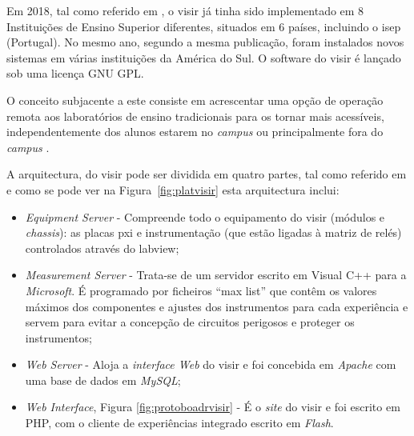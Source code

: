 Em 2018, tal como referido em \cite{PILARFederationVISIR}, o \acrshort{visir} já tinha sido implementado em 8 Instituições de Ensino Superior diferentes, situados em 6 países, incluindo o \acrshort{isep} (Portugal). No mesmo ano, segundo a mesma publicação, foram instalados novos sistemas em várias instituições da América do Sul. O software do \acrshort{visir} é lançado sob uma licença GNU GPL.

O conceito subjacente a este consiste em acrescentar uma opção de operação remota aos laboratórios de ensino tradicionais para os tornar mais acessíveis, independentemente dos alunos estarem no \textit{campus} ou principalmente fora do \textit{campus} \cite{TheVISIRproject}.

A arquitectura, do \acrshort{visir} pode ser dividida em quatro partes, tal como referido em \cite{tawfikexperiences} e como se pode ver na Figura~\ref{fig:platvisir} esta arquitectura inclui:
\begin{itemize}
    \item \textit{Equipment  Server} - Compreende todo o equipamento do \acrshort{visir} (módulos e \textit{chassis}): as placas \acrfull{pxi} e instrumentação (que estão ligadas à matriz de relés) controlados através do \acrshort{labview};
    \item \textit{Measurement Server} - Trata-se de um servidor escrito em Visual C++ para a \textit{Microsoft}. É programado por ficheiros ``max list'' que contêm os valores máximos dos componentes e ajustes dos instrumentos para cada experiência e servem para evitar a concepção de circuitos perigosos e proteger os instrumentos;
    \item \textit{Web Server} - Aloja a \textit{interface Web} do \acrshort{visir} e foi concebida em \textit{Apache} com uma base de dados em \textit{MySQL};
    \item \textit{Web Interface}, Figura \ref{fig:protoboadrvisir} - É o \textit{site} do \acrshort{visir} e foi escrito em PHP, com o cliente de experiências integrado escrito em \textit{Flash}.
\end{itemize}

